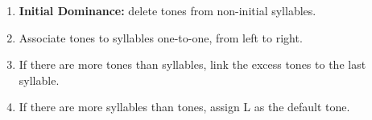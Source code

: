 \documentclass[11pt]{article}
\begin{document}
\begin{enumerate}[label=\alph*.]
	\item \textbf{Initial Dominance:} delete tones from non-initial syllables.
	\item Associate tones to syllables one-to-one, from left to right.
	\item If there are more tones than syllables, link the excess tones to the last syllable.
	\item If there are more syllables than tones, assign \textsc{L} as the default tone.
\end{enumerate}






\end{document}
